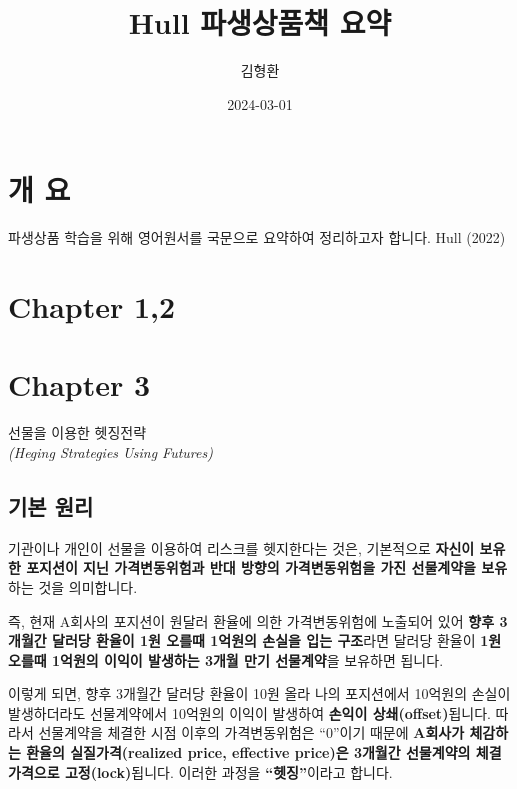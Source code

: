 \documentclass[
  letterpaper,
  DIV=11,
  numbers=noendperiod]{scrreprt}
\title{Hull 파생상품책 요약}
\author{김형환}
\date{2024-03-01}
\renewcommand*\contentsname{Table of contents}
\newcommand\contentsname{Table of contents}
\begin{document}
\maketitle

\renewcommand*\contentsname{Table of contents}
{
\hypersetup{linkcolor=}
\setcounter{tocdepth}{2}
\tableofcontents
}

\chapter{개 요}\label{uxac1c-uxc694}

파생상품 학습을 위해 영어원서를 국문으로 요약하여 정리하고자 합니다.
Hull (2022)


\chapter{Chapter 1,2}\label{chapter-12}


\chapter{Chapter 3}\label{chapter-3}

선물을 이용한 헷징전략\\
\emph{(Heging Strategies Using Futures)}

\section{기본 원리}\label{uxae30uxbcf8-uxc6d0uxb9ac}

기관이나 개인이 선물을 이용하여 리스크를 헷지한다는 것은, 기본적으로
\textbf{자신이 보유한 포지션이 지닌 가격변동위험과 반대 방향의
가격변동위험을 가진 선물계약을 보유}하는 것을 의미합니다.

즉, 현재 A회사의 포지션이 원달러 환율에 의한 가격변동위험에 노출되어
있어 \textbf{향후 3개월간 달러당 환율이 1원 오를때 1억원의 손실을 입는
구조}라면 달러당 환율이 \textbf{1원 오를때 1억원의 이익이 발생하는 3개월
만기 선물계약}을 보유하면 됩니다.

이렇게 되면, 향후 3개월간 달러당 환율이 10원 올라 나의 포지션에서
10억원의 손실이 발생하더라도 선물계약에서 10억원의 이익이 발생하여
\textbf{손익이 상쇄(offset)}됩니다. 따라서 선물계약을 체결한 시점 이후의
가격변동위험은 ``0''이기 때문에 \textbf{A회사가 체감하는 환율의
실질가격(realized price, effective price)은 3개월간 선물계약의
체결가격으로 고정(lock)}됩니다. 이러한 과정을 \textbf{``헷징''}이라고
합니다.
\end{document}
